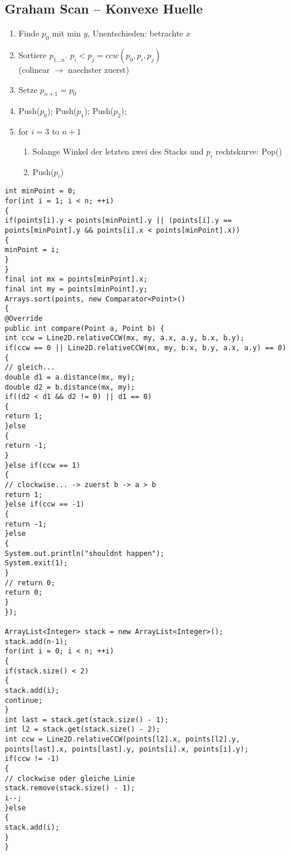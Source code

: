 \subsection{Graham Scan -- Konvexe Huelle}

        \begin{enumerate}
        \item Finde $p_0$ mit min $y$, Unentschieden: betrachte $x$
        \item Sortiere $p_{1\ldots n}$. $p_i < p_j = ccw(p_0,p_i,p_j)$\\
        (colinear $\rightarrow$ naechster zuerst)
        \item Setze $p_{n+1}=p_0$
        \item Push($p_0$); Push($p_1$); Push($p_2$);
        \item for $i=3$ to $n+1$
        \begin{enumerate}
            \item Solange Winkel der letzten zwei des Stacks und $p_i$ rechtskurve: Pop()
            \item Push($p_i$)
        \end{enumerate}
        \end{enumerate}

\begin{lstlisting}
int minPoint = 0;
for(int i = 1; i < n; ++i)
{
if(points[i].y < points[minPoint].y || (points[i].y == points[minPoint].y && points[i].x < points[minPoint].x))
{
minPoint = i;
}
}
final int mx = points[minPoint].x;
final int my = points[minPoint].y;
Arrays.sort(points, new Comparator<Point>()
{
@Override
public int compare(Point a, Point b) {
int ccw = Line2D.relativeCCW(mx, my, a.x, a.y, b.x, b.y);
if(ccw == 0 || Line2D.relativeCCW(mx, my, b.x, b.y, a.x, a.y) == 0)
{
// gleich...
double d1 = a.distance(mx, my);
double d2 = b.distance(mx, my);
if((d2 < d1 && d2 != 0) || d1 == 0)
{
return 1;
}else
{
return -1;
}
}else if(ccw == 1)
{
// clockwise... -> zuerst b -> a > b
return 1;
}else if(ccw == -1)
{
return -1;
}else
{
System.out.println("shouldnt happen");
System.exit(1);
}
// return 0;
return 0;
}
});

ArrayList<Integer> stack = new ArrayList<Integer>();
stack.add(n-1);
for(int i = 0; i < n; ++i)
{
if(stack.size() < 2)
{
stack.add(i);
continue;
}
int last = stack.get(stack.size() - 1);
int l2 = stack.get(stack.size() - 2);
int ccw = Line2D.relativeCCW(points[l2].x, points[l2].y, points[last].x, points[last].y, points[i].x, points[i].y);
if(ccw != -1)
{
// clockwise oder gleiche Linie
stack.remove(stack.size() - 1);
i--;
}else
{
stack.add(i);
}
}
\end{lstlisting}